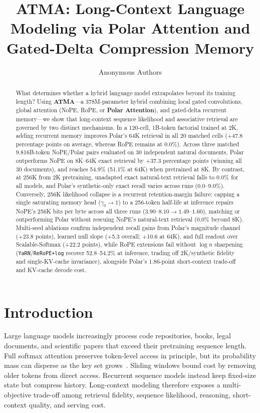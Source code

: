\documentclass{article}
\title{ATMA: Long-Context Language Modeling via Polar Attention and Gated-Delta Compression Memory}
\author{Anonymous Authors}
\newcommand{\rev}[1]{{\color{revcolor}#1}}
\begin{document}
\maketitle

\begin{abstract}
What determines whether a hybrid language model extrapolates beyond its training length? Using \textbf{ATMA}---a 378M-parameter hybrid combining local gated convolutions, global attention (NoPE, RoPE, or \textbf{Polar Attention}), and gated-delta recurrent memory---\rev{we show that long-context sequence likelihood and associative retrieval are governed by two distinct mechanisms.} In a 120-cell, 1B-token factorial trained at 2K, adding recurrent memory improves Polar's 64K retrieval in all 20 matched cells (+47.8 percentage points on average, whereas RoPE remains at 0.0\%). \rev{Across three matched 9.816B-token NoPE/Polar pairs evaluated on 30 independent natural documents, Polar outperforms NoPE on 8K--64K exact retrieval by +37.3 percentage points (winning all 30 documents), and reaches 54.9\% (51.1\% at 64K) when pretrained at 8K. By contrast, at 256K from 2K pretraining, unadapted exact natural-text retrieval falls to 0.0\% for all models, and Polar's synthetic-only exact recall varies across runs (0.0--9.0\%). Conversely, 256K likelihood collapse is a recurrent retention-margin failure: capping a single saturating memory head ($\gamma_0\rightarrow1$) to a 256-token half-life at inference repairs NoPE's 256K bits per byte across all three runs ($3.90\text{--}8.10\rightarrow1.49\text{--}1.60$), matching or outperforming Polar without rescuing NoPE's natural-text retrieval (0.0\% beyond 8K). Multi-seed ablations confirm independent recall gains from Polar's magnitude channel (+23.8 points), learned null slope (+5.3 overall; +10.6 at 64K), and full readout over Scalable-Softmax (+22.2 points), while RoPE extensions fail without $\log n$ sharpening (\texttt{YaRN}/\texttt{ReRoPE+log} recover 52.8--54.2\% at inference, trading off 2K/synthetic fidelity and single-KV-cache invariance), alongside Polar's 1.86-point short-context trade-off and KV-cache decode cost.}
\end{abstract}

\section{Introduction}

Large language models increasingly process code repositories, books, legal documents, and scientific papers that exceed their pretraining sequence length. Full softmax attention preserves token-level access in principle, but its probability mass can disperse as the key set grows~\citep{nakanishi2025scalable,velickovic2025softmax,barbero2024glasses}. Sliding windows bound cost by removing older tokens from direct access. Recurrent sequence models instead keep fixed-size state but compress history. Long-context modeling therefore exposes a multi-objective trade-off among retrieval fidelity, sequence likelihood, reasoning, short-context quality, and serving cost.
\end{document}
